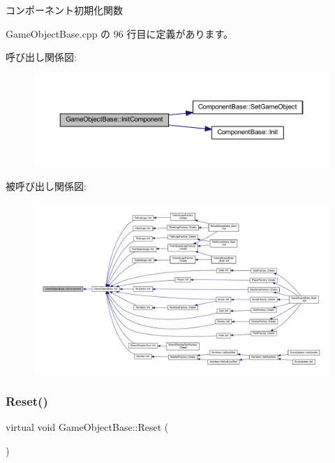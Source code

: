 コンポーネント初期化関数 



 Game\+Object\+Base.\+cpp の 96 行目に定義があります。

呼び出し関係図\+:\nopagebreak
\begin{figure}[H]
\begin{center}
\leavevmode
\includegraphics[width=350pt]{class_game_object_base_a5f4d4e3d23603d8e32ddb220a53039a6_cgraph}
\end{center}
\end{figure}
被呼び出し関係図\+:\nopagebreak
\begin{figure}[H]
\begin{center}
\leavevmode
\includegraphics[width=350pt]{class_game_object_base_a5f4d4e3d23603d8e32ddb220a53039a6_icgraph}
\end{center}
\end{figure}
\mbox{\label{class_game_object_base_a85c59554f734bcb09f1a1e18d9517dce}} 
\subsubsection{\texorpdfstring{Reset()}{Reset()}}
{\footnotesize\ttfamily virtual void Game\+Object\+Base\+::\+Reset (\begin{DoxyParamCaption}{ }\end{DoxyParamCaption})\hspace{0.3cm}{\ttfamily [pure virtual]}}



